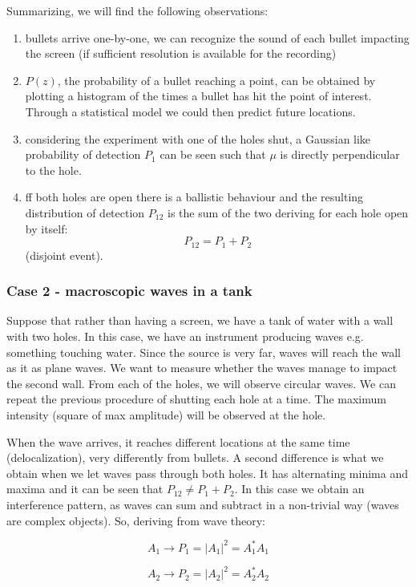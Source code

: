   Summarizing, we will find the following observations:
  \begin{enumerate}
      \item bullets arrive one-by-one, we can recognize the sound of each bullet impacting the screen (if sufficient resolution is available for the recording)
      \item $P(z)$, the probability of a bullet reaching a point, can be obtained by plotting a histogram of the times a bullet has hit the point of interest. Through a statistical model we could then predict future locations. 
       \item considering the experiment with one of the holes shut, a Gaussian like probability of detection $P_1$ can be seen such that $\mu$ is directly perpendicular to the hole.
       \item ff both holes are open there is a ballistic behaviour and the resulting distribution of detection $P_{12}$ is the sum of the two deriving for each hole open by itself: $$P_{12} = P_1+P_2$$ (disjoint event).
  \end{enumerate}
    
  
    \subsubsection{Case 2 - macroscopic waves in a tank}
    Suppose that rather than having a screen, we have a tank of water with a wall with two holes. In this case, we have an instrument producing waves e.g. something touching water. Since the source is very far, waves will reach the wall as it as plane waves. We want to measure whether the waves manage to impact the second wall. From each of the holes, we will observe circular waves. We can repeat the previous procedure of shutting each hole at a time. The maximum intensity (square of max amplitude) will be observed at the hole. 

  When the wave arrives, it reaches different locations at the same time (delocalization), very differently from bullets.   A second difference is what we obtain when we let waves pass through both holes. It has alternating minima and maxima and it can be seen that $P_{12} \neq P_1+P_2$. In this case we obtain an interference pattern, as waves can sum and subtract in a non-trivial way (waves are complex objects).
    So, deriving from wave theory:

    $$A_1\rightarrow P_1 = |A_1|^2 = A_1^*A_1$$
      
    $$A_2\rightarrow P_2 = |A_2|^2 = A_2^*A_2$$


